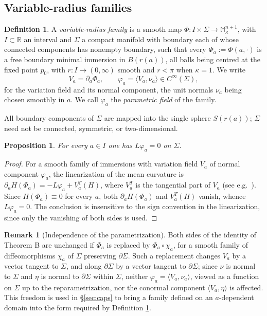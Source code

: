 \documentclass[11pt,a4paper]{amsart}
\theoremstyle{plain}
\newtheorem{proposition}[theorem]{Proposition}
\theoremstyle{definition}
\newtheorem{definition}[theorem]{Definition}
\newtheorem{remark}[theorem]{Remark}
\newcommand{\M}{\mathbb{M}}
\newcommand{\R}{\mathbb{R}}
\begin{document}
\subsection*{Variable-radius families}

\begin{definition}\label{def:family}
A \emph{variable-radius family} is a smooth map $\Phi:I\times\Sigma\to\M^{n+1}_\kappa$, with $I\subset\R$ an interval and $\Sigma$ a compact manifold with boundary each of whose connected components has nonempty boundary, such that every $\Phi_a:=\Phi(a,\cdot)$ is a free boundary minimal immersion in $B(r(a))$, all balls being centred at the fixed point $p_0$, with $r:I\to(0,\infty)$ smooth and $r<\pi$ when $\kappa=1$. We write
\[
V_a=\partial_a\Phi_a,\qquad \varphi_a=\langle V_a,\nu_a\rangle\in C^\infty(\Sigma),
\]
for the variation field and its normal component, the unit normals $\nu_a$ being chosen smoothly in $a$. We call $\varphi_a$ the \emph{parametric field} of the family.
\end{definition}

All boundary components of $\Sigma$ are mapped into the single sphere $S(r(a))$; $\Sigma$ need not be connected, symmetric, or two-dimensional.

\begin{proposition}\label{prop:jacobi}
For every $a\in I$ one has $L\varphi_a=0$ on $\Sigma$.
\end{proposition}

\begin{proof}
For a smooth family of immersions with variation field $V_a$ of normal component $\varphi_a$, the linearization of the mean curvature is $\partial_aH(\Phi_a)=-L\varphi_a+V_a^{T}(H)$, where $V_a^T$ is the tangential part of $V_a$ (see e.g.\ \cite[\S 5]{Med23}). Since $H(\Phi_a)\equiv 0$ for every $a$, both $\partial_aH(\Phi_a)$ and $V_a^T(H)$ vanish, whence $L\varphi_a=0$. The conclusion is insensitive to the sign convention in the linearization, since only the vanishing of both sides is used.
\end{proof}

\begin{remark}[Independence of the parametrization]\label{rem:reparam}
Both sides of the identity of Theorem B are unchanged if $\Phi_a$ is replaced by $\Phi_a\circ\chi_a$, for a smooth family of diffeomorphisms $\chi_a$ of $\Sigma$ preserving $\partial\Sigma$. Such a replacement changes $V_a$ by a vector tangent to $\Sigma$, and along $\partial\Sigma$ by a vector tangent to $\partial\Sigma$; since $\nu$ is normal to $\Sigma$ and $\eta$ is normal to $\partial\Sigma$ within $\Sigma$, neither $\varphi_a=\langle V_a,\nu_a\rangle$, viewed as a function on $\Sigma$ up to the reparametrization, nor the conormal component $\langle V_a,\eta\rangle$ is affected. This freedom is used in \S\ref{sec:caps} to bring a family defined on an $a$-dependent domain into the form required by Definition \ref{def:family}.
\end{remark}
\end{document}
